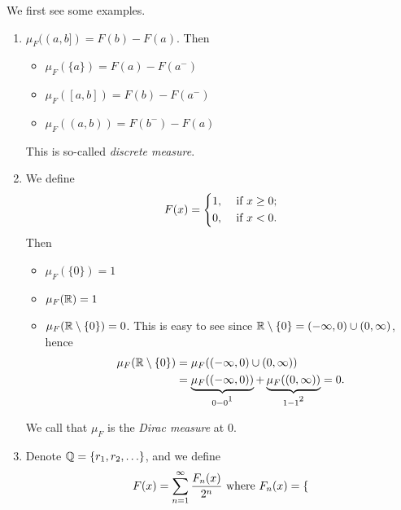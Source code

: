 \begin{eg}
	We first see some examples.
	\begin{enumerate}
		\item \label{eg:discrete-measure}\(\mu _F((a, b]) = F(b) - F(a)\). Then
		      \begin{itemize}
			      \item \(\mu _F(\{a\}) = F(a) - F(a^-)\)
			      \item \(\mu _F([a, b]) = F(b) - F(a^-)\)
			      \item \(\mu _F((a, b)) = F(b^-) - F(a)\)
		      \end{itemize}
		      This is so-called \emph{discrete measure}.
		\item We define
		      \[
			      F(x) = \begin{dcases}
				      1, & \text{ if } x\geq 0 ; \\
				      0, & \text{ if } x<0.
			      \end{dcases}
		      \]
		      Then
		      \begin{itemize}
			      \item \(\mu _F(\{0\})=1\)
			      \item \(\mu _F(\mathbb{\MakeUppercase{r}} ) = 1\)
			      \item \(\mu _F(\mathbb{\MakeUppercase{r}}\setminus \{0\} ) = 0\). This is easy to see since \(\mathbb{\MakeUppercase{r}} \setminus \{0\} = (-\infty , 0)\cup (0, \infty )\), hence
			            \[
				            \begin{split}
					            \mu _F(\mathbb{\MakeUppercase{r}} \setminus \{0\}) &= \mu _F((-\infty , 0)\cup (0, \infty ))\\
					            &= \underbrace{\mu _F((-\infty , 0))}_{0 - 0\footnotemark } + \underbrace{\mu _F((0, \infty ))}_{1 -1 \footnotemark }= 0.
				            \end{split}
			            \]
			            \addtocounter{footnote}{-2}
		      \end{itemize}
		      We call that \(\mu _F\) is the \emph{Dirac measure} at \(0\).
		      \item\label{eg:lec8-3} Denote \(\mathbb{\MakeUppercase{q}} = \{r_1, r_2, \ldots  \}\), and we define
		      \[
			      F(x) = \sum\limits_{n=1}^{\infty} \frac{F_n(x)}{2^n} \text{ where }  F_{n}(x) = \begin{dcases}

\end{dcases}\]
\end{enumerate}
\end{eg}
